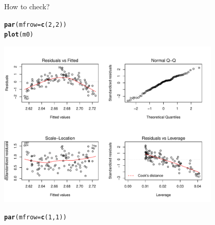 \documentclass[10pt]{beamer}\usepackage[]{graphicx}\usepackage[]{color}
\makeatletter
\newcommand{\hlnum}[1]{\textcolor[rgb]{0.686,0.059,0.569}{#1}}%
\newcommand{\hlstd}[1]{\textcolor[rgb]{0.345,0.345,0.345}{#1}}%
\newcommand{\hlkwc}[1]{\textcolor[rgb]{0.333,0.667,0.333}{#1}}%
\newcommand{\hlkwd}[1]{\textcolor[rgb]{0.737,0.353,0.396}{\textbf{#1}}}%
\newenvironment{kframe}{%
 \def\at@end@of@kframe{}%
 \ifinner\ifhmode%
  \def\at@end@of@kframe{\end{minipage}}%
  \begin{minipage}{\columnwidth}%
 \fi\fi%
 \def\FrameCommand##1{\hskip\@totalleftmargin \hskip-\fboxsep
 \colorbox{shadecolor}{##1}\hskip-\fboxsep
     \hskip-\linewidth \hskip-\@totalleftmargin \hskip\columnwidth}%
 \MakeFramed {\advance\hsize-\width
   \@totalleftmargin\z@ \linewidth\hsize
   \@setminipage}}%
 {\par\unskip\endMakeFramed%
 \at@end@of@kframe}
\newenvironment{knitrout}{}{} %
\makeatother
\begin{document}
\begin{frame}[fragile]{How to check?}
\begin{knitrout}
\color{fgcolor}\begin{kframe}
\begin{alltt}
\hlkwd{par}\hlstd{(}\hlkwc{mfrow}\hlstd{=}\hlkwd{c}\hlstd{(}\hlnum{2}\hlstd{,}\hlnum{2}\hlstd{))}
  \hlkwd{plot}\hlstd{(m0)}
\end{alltt}
\end{kframe}
\includegraphics[width=0.8\textwidth,height=0.6\textwidth]{figure/unnamed-chunk-8-1} 
\begin{kframe}\begin{alltt}
\hlkwd{par}\hlstd{(}\hlkwc{mfrow}\hlstd{=}\hlkwd{c}\hlstd{(}\hlnum{1}\hlstd{,}\hlnum{1}\hlstd{))}
\end{alltt}
\end{kframe}
\end{knitrout}
\end{frame}
\end{document}
